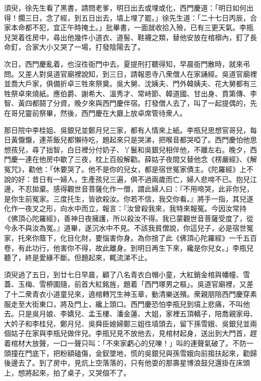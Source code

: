 須臾，徐先生看了黑書，請問老爹，明日出去或埋或化，西門慶道：「明日如何出得！擱三日，念了經，到五日出去，墳上埋了罷。」徐先生道：「二十七日丙辰，合家本命都不犯，宜正午時掩土。」批畢書，一面就收拾入殮，已有三更天氣。李瓶兒哭着徃房中，尋出他幾件小道衣、道髻、鞋襪之類，替他安放在棺槨內，釘了長命釘，合家大小又哭了一場，打發陰陽去了。

次日，西門慶亂着，也沒徃衙門中去。夏提刑打聽得知，早晨衙門散時，就來弔問。又差人對吳道官廟裡說知，到三日，請報恩寺八衆僧人在家誦經。吳道官廟裡並喬大戶家，俱備折卓三牲來祭奠。吳大舅、沈姨夫、門外韓姨夫、花大舅都有三牲祭卓來燒紙。應伯爵、謝希大、溫秀才、常峙節、韓道國、甘出身、賁第傳、李智、黃四都鬪了分資，晚夕來與西門慶伴宿。打發僧人去了，叫了一起提偶的，先在哥兒靈前祭畢，然後，西門慶在大廳上放卓席管待衆人。

那日院中李桂姐、吳銀兒並鄭月兒三家，都有人情來上紙。李瓶兒思想官哥兒，每日黃懨懨，連茶飯兒都懶待吃，題起來只是哭涕，把喉音都哭啞了。西門慶怕他思想孩兒，尋了拙智，白日裡分付奶子、丫鬟和吳銀兒相伴他，不離左右。晚夕，西門慶一連在他房中歇了三夜，枕上百般解勸。薛姑子夜間又替他念《楞嚴經》、《解冤咒》，勸他：「休要哭了。他不是你的兒女，都是宿世冤家債主。《陀羅經》上不說的好：昔日有一婦人，生產孩兒三遍，俱不過兩歲而亡，婦人悲啼不已。抱兒江邊，不忍拋棄。感得觀世音菩薩化作一僧，謂此婦人曰：『不用啼哭，此非你兒，是你生前冤家。三度托生，皆欲殺汝。你若不信，我交你看。』將手一指，其兒遂化作一夜叉之形，向水中而立，報言：『汝曾殺我來，我特來報冤。今因汝常持《佛頂心陀羅經》，善神日夜擁護，所以殺汝不得。我已蒙觀世音菩薩受度了，從今永不與汝為冤。』道畢，遂沉水中不見。不該我貧僧說，你這兒子，必是宿世冤家，托來你蔭下，化目化財，要惱害你身。為你捨了此《佛頂心陀羅經》一千五百卷，有此功行，他害你不得，故此離身。{}到明日再生下來，纔是你兒女。」{}李瓶兒聽了，終是愛緣不斷。但題起來，輒流涕不止。

須臾過了五日，到廿七日早晨，顧了八名青衣白帽小童，大紅銷金棺與幡幢、雪蓋、玉梅、雪桺圍隨，前首大紅銘旌，題着「西門塚男之樞」。吳道官廟裡，又差了十二衆青衣小道童兒來，遶棺轉咒生神玉章，動清樂送殯。衆親朋陪西門慶穿素服走至大街東口，將及門上，纔上頭口。西門慶恐怕李瓶兒到墳上悲痛，不叫他去。只是吳月娘、李嬌兒、孟玉樓、潘金蓮、大姐，家裡五頂轎子，陪喬親家母、大妗子和李桂兒、鄭月兒、吳舜臣媳婦鄭三姐徃墳頭去，留下孫雪娥、吳銀兒並兩個姑子在家與李瓶兒做伴兒。李瓶兒見不放他去，見棺材起身，送出到大門首，趕着棺材大放聲，一口一聲只叫：「不來家虧心的兒嚛！」叫的連聲氣破了。不防一頭撞在門底下，把粉額磕傷，金釵墜地，慌的吳銀兒與孫雪娥向前搊扶起來，勸歸後邊去了。到了房中，見炕上空落落的，只有他耍的那壽星博浪鼓兒還掛在床頭上，想將起來，{}拍了桌子，又哭個不了。

